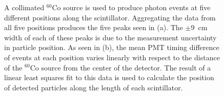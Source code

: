 \begin{figure}[]
    \centering
    

    \caption{
    A collimated $^{60}$Co source is used to produce photon events at five different positions along the scintillator.
    Aggregating the data from all five positions produces the five peaks seen in (a).
    The $\pm9$~cm width of each of these peaks is due to the measurement uncertainty in particle position.
    As seen in (b), the mean PMT timing difference of events at each position varies linearly with respect to the distance of the $^{60}$Co source from the center of the detector. 
    The result of a linear least squares fit to this data is used to calculate the position of detected particles along the length of each scintillator.
    }
    \label{fig:PMTDifference}
\end{figure}

